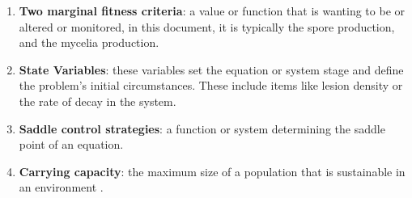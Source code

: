 \documentclass[11pt]{amsart}
\begin{document}
\begin{enumerate}
    \item\label{term:marginal} \textbf{Two marginal fitness criteria}: a value or function that is wanting to be or altered or monitored, in this document, it is typically the spore production, and the mycelia production.
    \item\label{term:statevariables} \textbf{State Variables}: these variables set the equation or system stage and define the problem's initial circumstances. These include items like lesion density or the rate of decay in the system.
    \item\label{term:saddlecontrol} \textbf{Saddle control strategies}: a function or system determining the saddle point of an equation.
    \item\label{term:carryingcapacity} \textbf{Carrying capacity}: the maximum size of a population that is sustainable in an environment \cite{carryingcapacity}.
    
\end{enumerate}
\end{document}
